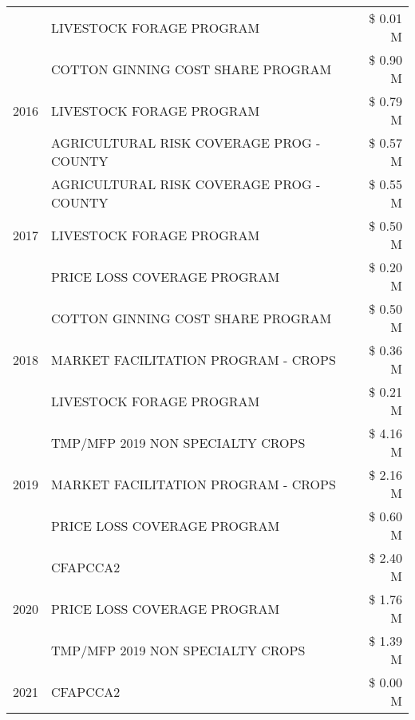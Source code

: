 \begin{tabular}{llr}
 & LIVESTOCK FORAGE PROGRAM & \$ 0.01 M \\
\cline{1-3}
\multirow[t]{3}{*}{2016} & COTTON GINNING COST SHARE PROGRAM             & \$ 0.90 M \\
 & LIVESTOCK FORAGE PROGRAM                      & \$ 0.79 M \\
 & AGRICULTURAL RISK COVERAGE PROG - COUNTY      & \$ 0.57 M \\
\cline{1-3}
\multirow[t]{3}{*}{2017} & AGRICULTURAL RISK COVERAGE PROG - COUNTY & \$ 0.55 M \\
 & LIVESTOCK FORAGE PROGRAM & \$ 0.50 M \\
 & PRICE LOSS COVERAGE PROGRAM & \$ 0.20 M \\
\cline{1-3}
\multirow[t]{3}{*}{2018} & COTTON GINNING COST SHARE PROGRAM & \$ 0.50 M \\
 & MARKET FACILITATION PROGRAM - CROPS & \$ 0.36 M \\
 & LIVESTOCK FORAGE PROGRAM & \$ 0.21 M \\
\cline{1-3}
\multirow[t]{3}{*}{2019} & TMP/MFP 2019 NON SPECIALTY CROPS & \$ 4.16 M \\
 & MARKET FACILITATION PROGRAM - CROPS & \$ 2.16 M \\
 & PRICE LOSS COVERAGE PROGRAM & \$ 0.60 M \\
\cline{1-3}
\multirow[t]{3}{*}{2020} & CFAPCCA2 & \$ 2.40 M \\
 & PRICE LOSS COVERAGE PROGRAM & \$ 1.76 M \\
 & TMP/MFP 2019 NON SPECIALTY CROPS & \$ 1.39 M \\
\cline{1-3}
2021 & CFAPCCA2 & \$ 0.00 M \\
\cline{1-3}
\bottomrule
\end{tabular}
